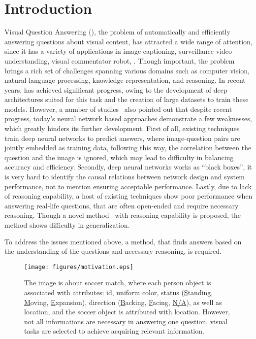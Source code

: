 \section{Introduction}
\label{sec-intro}


Visual Question Answering (\vqa), the
problem of automatically and efficiently answering questions about visual content, has attracted a wide range of attention, since it has a variety of applications in \eg image captioning, surveillance video understanding, visual commentator robot, \etc. 
Though important, the \vqa problem brings a rich set of challenges spanning various domains such as computer vision, natural language processing, knowledge representation, and reasoning. 
In recent years, \vqa has achieved significant
progress, owing to the development of deep architectures suited for this task and the creation of large \vqa datasets to train these models. 
However, a number of studies~\cite{peixi2019,Goyal_2017} also pointed out that despite recent progress, today's neural network based approaches demonstrate a few weaknesses, which greatly hinders its further development. First of all, existing techniques train deep neural networks to predict answers, where image-question pairs are jointly embedded as training data, following this way, the correlation between the question and the image is ignored, which may lead to difficulty in balancing accuracy and efficiency. Secondly, deep neural networks works as ``black boxes'', it is very hard to identify the causal relations between network design and system performance, not to mention ensuring acceptable performance. Lastly, due to lack of reasoning capability, a host of existing techniques show poor performance when answering real-life questions, that are often open-ended and require necessary reasoning. Though a novel method~\cite{peixi2019} with reasoning capability is proposed, the method shows difficulty in generalization.  

To address the issues mentioned above, a method, that finds answers based on the understanding of the questions and necessary reasoning, is required. 


\begin{figure}[tb]
\centering
\texttt{[image: figures/motivation.eps]}
\caption{The image is about soccer match, where each person object is associated with attributes: id, uniform color, status (\underline{S}tanding, \underline{M}oving, \underline{E}xpansion), direction (\underline{B}acking, \underline{F}acing, \underline{N/A}), as well as location, and the soccer object is attributed with location. However, not all informations are necessary in answering one question, visual tasks are selected to achieve acquiring relevant information.%
}
\vspace{-4ex}
\label{fig:example}
\end{figure}


